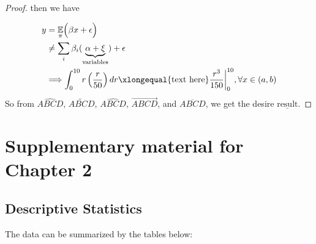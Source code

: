 \documentclass[letterpaper]{report}
\newcommand{\E}{\mathbb{E}}
\begin{document}
\begin{appendices}
\begin{proof}
    then we have
    
    \begin{align}
      \nonumber y&=\underset{\pi}{\E}\Big(\beta x + \epsilon\Big)\\
      &\neq\sum\limits_{i}\beta_i(\underbrace{\alpha+\xi}_{\text{variables}}) + \epsilon\\
      &\Longrightarrow \int_{0}^{10}r \left( \dfrac{r}{50} \right)dr\xlongequal{\text{text here}}\dfrac{r^{3}}{150}\biggr\rvert^{10}_{0}, \forall x\in (a,b)
    \end{align}
    So from $\widehat{ABCD}$, $\widetilde{ABCD}$, $\widehat{ABCD}$, $\overrightarrow{ABCD}$, and $\overline{ABCD}$, we get the desire $\underline{\text{result}}$.
  \end{proof}
  
  \chapter{Supplementary material for Chapter 2}
  
  \setcounter{table}{0}
  
  \section{Descriptive Statistics}
  
  The data can be summarized by the tables below:
  

\end{appendices}
\end{document}
